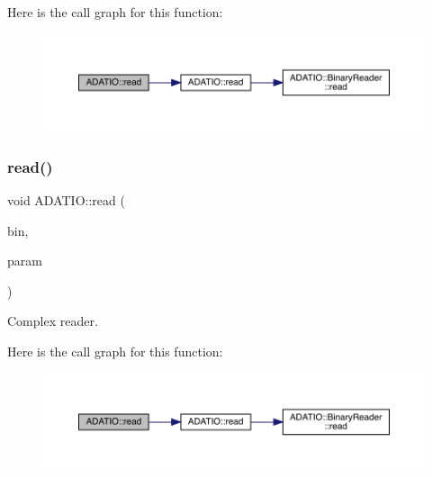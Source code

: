Here is the call graph for this function\+:\nopagebreak
\begin{figure}[H]
\begin{center}
\leavevmode
\includegraphics[width=350pt]{d0/dba/namespaceADATIO_aa439c7d6dfc63d8424816de24810141d_cgraph}
\end{center}
\end{figure}
\mbox{\label{namespaceADATIO_a99479bf376afa5196fad6684a360c7af}} 
\subsubsection{\texorpdfstring{read()}{read()}\hspace{0.1cm}{\footnotesize\ttfamily [15/28]}}
{\footnotesize\ttfamily void A\+D\+A\+T\+I\+O\+::read (\begin{DoxyParamCaption}\item[{\mbox{\hyperlink{classADATIO_1_1BinaryReader}{Binary\+Reader}} \&}]{bin,  }\item[{std\+::complex$<$ double $>$ \&}]{param }\end{DoxyParamCaption})}



Complex reader. 

Here is the call graph for this function\+:\nopagebreak
\begin{figure}[H]
\begin{center}
\leavevmode
\includegraphics[width=350pt]{d0/dba/namespaceADATIO_a99479bf376afa5196fad6684a360c7af_cgraph}
\end{center}
\end{figure}
\mbox{\label{namespaceADATIO_a16a912dec3b1d1424a44c9f1a6cd915f}} 
